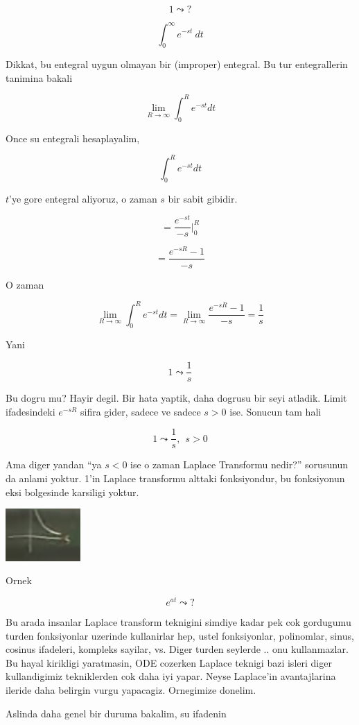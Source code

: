 \documentclass[12pt,fleqn]{article}
\begin{document}
\[ 1 \leadsto ? \]

\[ \int_0^{\infty} e^{-st} \ dt \]

Dikkat, bu entegral uygun olmayan bir (improper) entegral. Bu tur
entegrallerin tanimina bakali 

\[ \lim_{R \to \infty}  \int_{0}^{R} e^{-st} dt  \]

Once su entegrali hesaplayalim, 

\[  \int_{0}^{R} e^{-st} dt \]

$t$'ye gore entegral aliyoruz, o zaman $s$ bir sabit gibidir. 

\[  = \frac{ e^{-st}}{-s}  \bigg|_{0}^{R} \]

\[ = \frac{e^{-sR} - 1}{-s} \]

O zaman 

\[ \lim_{R \to \infty}  \int_{0}^{R} e^{-st} dt  = 
\lim_{R \to \infty} \frac{e^{-sR} - 1}{-s}  = 
\frac{1}{s}
\]

Yani 

\[ 1 \leadsto \frac{1}{s} \]

Bu dogru mu? Hayir degil. Bir hata yaptik, daha dogrusu bir seyi
atladik. Limit ifadesindeki $e^{-sR}$ sifira gider, sadece ve sadece $s >
0$ ise. 
Sonucun tam hali 

\[ 1 \leadsto \frac{1}{s}, \ \ s > 0 \]

Ama diger yandan ``ya $s < 0$ ise o zaman Laplace Transformu nedir?''
sorusunun da anlami yoktur. 1'in Laplace transformu alttaki fonksiyondur,
bu fonksiyonun eksi bolgesinde karsiligi yoktur. 

\includegraphics[height=2cm]{19_2.png}

Ornek 

\[ e^{at} \leadsto ? \]

Bu arada insanlar Laplace transform teknigini simdiye kadar pek cok
gordugumu turden fonksiyonlar uzerinde kullanirlar hep, ustel fonksiyonlar,
polinomlar, sinus, cosinus ifadeleri, kompleks sayilar, vs. Diger turden
seylerde .. onu kullanmazlar. Bu hayal kirikligi yaratmasin, ODE cozerken
Laplace teknigi bazi isleri diger kullandigimiz tekniklerden cok daha iyi
yapar. Neyse Laplace'in avantajlarina ileride daha belirgin vurgu
yapacagiz. Ornegimize donelim. 

Aslinda daha genel bir duruma bakalim, su ifadenin
\end{document}
